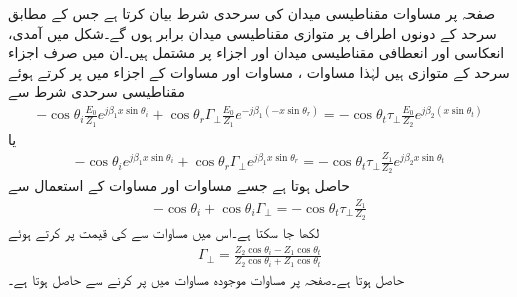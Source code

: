 صفحہ  پر  مساوات  مقناطیسی میدان کی سرحدی شرط بیان کرتا ہے جس کے مطابق سرحد کے دونوں اطراف پر متوازی مقناطیسی میدان برابر ہوں گے۔شکل  میں آمدی، انعکاسی اور انعطافی مقناطیسی میدان  اور  اجزاء  پر مشتمل ہیں۔ان میں صرف  اجزاء سرحد کے متوازی ہیں لہٰذا مساوات ، مساوات  اور مساوات  کے  اجزاء میں  پر کرتے ہوئے مقناطیسی سرحدی شرط سے  
\begin{align*}
 -\cos \theta_i \frac{E_0}{Z_1} e^{j\beta_1 x\sin \theta_i }+\cos \theta_r \Gamma_{\perp} \frac{ E_0}{Z_1} e^{-j \beta_1 (-x \sin \theta_r)}=-\cos \theta_t  \tau_{\perp} \frac{E_0}{Z_2} e^{j \beta_2 (x \sin \theta_t)}
\end{align*}
یا
\begin{align*}
 -\cos \theta_i  e^{j\beta_1 x\sin \theta_i }+\cos \theta_r \Gamma_{\perp}  e^{j \beta_1 x \sin \theta_r}=-\cos \theta_t  \tau_{\perp} \frac{Z_1}{Z_2} e^{j \beta_2  x \sin \theta_t}
\end{align*}
حاصل ہوتا ہے جسے مساوات  اور مساوات  کے استعمال سے
\begin{align*}
 -\cos \theta_i +\cos \theta_i \Gamma_{\perp} =-\cos \theta_t  \tau_{\perp} \frac{Z_1}{Z_2}
\end{align*}
لکھا جا سکتا ہے۔اس میں مساوات  سے  کی قیمت پر کرتے ہوئے
\begin{align}\label{مساوات_ترچھی_شرح_انعکاس_عمودی_الف}
\Gamma_{\perp}=\frac{Z_2 \cos \theta_i -Z_1 \cos \theta_t}{Z_2 \cos \theta_i +Z_1 \cos \theta_t}
\end{align}
حاصل ہوتا ہے۔صفحہ  پر مساوات  موجودہ مساوات میں  پر کرنے سے حاصل ہوتا ہے۔

